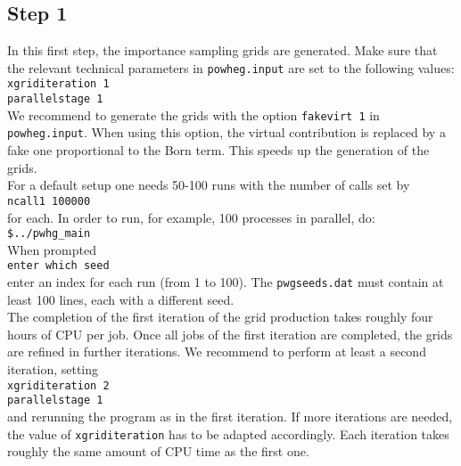 \documentclass[a4paper,11pt]{article}
\begin{document}
\subsection*{Step 1}
%
In this first step, the importance sampling grids are generated. Make sure that the relevant technical parameters in {\tt powheg.input} are set to the following values:
\\[2ex]
{\tt xgriditeration   1}
\\
{\tt parallelstage     1}
\\[2ex]
We recommend to generate the grids with the option {\tt fakevirt 1} in
{\tt powheg.input}. When using this option, the virtual contribution
is replaced by a fake one proportional to the Born term. This speeds
up the generation of the grids.
\\[2ex]
For a default setup one needs 50-100 runs with the number of calls set by
\\[2ex] 
{\tt ncall1 100000}
\\[2ex] 
for each. 
In order to run, for example, 100 processes in parallel, do: 
\\[2ex]
{\tt \$../pwhg\_main}
\\[2ex]
When prompted
\\[2ex]
{\tt enter which seed}
\\[2ex]
enter an index for each run (from 1 to 100). The {\tt pwgseeds.dat}
must contain at least 100 lines, each with a different seed.
\\[2ex]
The completion of the first iteration of the grid production takes
roughly four hours of CPU per job. Once all jobs of the first iteration are completed,  the grids are refined in further iterations. We recommend to perform at least a second iteration, setting 
\\[2ex]
{\tt xgriditeration   2}
\\
{\tt parallelstage     1}
\\[2ex]
%
and rerunning the program as in the first iteration. If more iterations are needed, the value of {\tt xgriditeration} has to be adapted accordingly.  Each iteration takes roughly the same amount of CPU time as the first one. 
 

\end{document}
